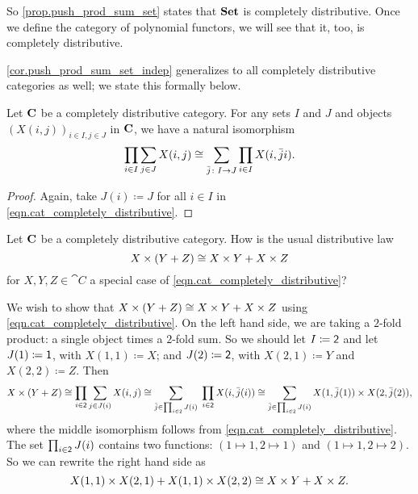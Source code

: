 \documentclass[Book-Poly]{subfiles}
\begin{document}
So \cref{prop.push_prod_sum_set} states that $\mathbf{Set}$ is completely distributive.
Once we define the category of polynomial functors, we will see that it, too, is completely distributive.

\cref{cor.push_prod_sum_set_indep} generalizes to all completely distributive categories as well; we state this formally below.

\begin{corollary} \label{cor.push_prod_sum_obj_indep}
    Let $\mathbf{C}$ be a completely distributive category.
    For any sets $I$ and $J$ and objects $(X(i, j))_{i \in I, j \in J}$ in $\mathbf{C}$, we have a natural isomorphism
    \begin{equation} \label{eqn.push_prod_sum_obj_indep}
        \prod_{i\in I}\sum_{j\in J}X(i,j)\cong\sum_{\bar{j}\colon I\to J}\prod_{i\in I}X(i,\bar{j}i).
    \end{equation}
\end{corollary}
\begin{proof}
    Again, take $J(i)\coloneqq J$ for all $i \in I$ in \eqref{eqn.cat_completely_distributive}.
\end{proof}

\begin{exercise}
    Let $\mathbf{C}$ be a completely distributive category.
    How is the usual distributive law
    \[
    X\times(Y+Z)\cong X\times Y+X\times Z
    \]
    for $X,Y,Z\in\cat{C}$ a special case of \eqref{eqn.cat_completely_distributive}?
    \begin{solution}
        We wish to show that $X\times (Y+Z)\cong X\times Y+X\times Z$ using \eqref{eqn.cat_completely_distributive}.
        On the left hand side, we are taking a $2$-fold product: a single object times a $2$-fold sum.
        So we should let $I\coloneqq\textsf{2}$ and let $J(1)\coloneqq\textsf{1}$, with $X(1,1)\coloneqq X$; and $J(2)\coloneqq\textsf{2}$, with $X(2,1)\coloneqq Y$ and $X(2,2)\coloneqq Z$.
        Then
        \[
        X\times(Y+Z)\cong \prod_{i\in\textsf{2}}\sum_{j\in J(i)}X(i,j) \cong \sum_{\bar{j}\in\prod_{i\in\textsf{2}}J(i)}\;\prod_{i\in \textsf{2}}X(i,\bar{j}(i)) \cong \sum_{\bar{j}\in\prod_{i\in\textsf{2}}J(i)}X(1,\bar{j}(1))\times X(2,\bar{j}(2)),
        \]
        where the middle isomorphism follows from \eqref{eqn.cat_completely_distributive}.
        The set $\prod_{i\in\textsf{2}}J(i)$ contains two functions: $(1\mapsto1,2\mapsto1)$ and $(1\mapsto1,2\mapsto2)$.
        So we can rewrite the right hand side as
        \[
        X(1,1)\times X(2,1)+X(1,1)\times X(2,2)\cong X\times Y+X\times Z.
        \]
    \end{solution}
\end{exercise}
\end{document}
